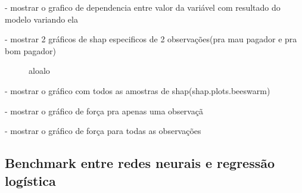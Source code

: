 - mostrar o grafico de dependencia entre valor da variável com resultado do modelo variando ela

- mostrar 2 gráficos de shap especificos de 2 observações(pra mau pagador e pra bom pagador)
\begin{figure}[H]
  \centering
  \vspace{.5cm}
  \vspace{.5cm}
  
  \label{fig:enter-label}
  \caption{aloalo}
\end{figure}

- mostrar o gráfico com todos as amostras de shap(shap.plots.beeswarm)


- mostrar o gráfico de força pra apenas uma observaçã

- mostrar o gráfico de força para todas as observações

\subsection*{Benchmark entre redes neurais e regressão logística}





\newpage